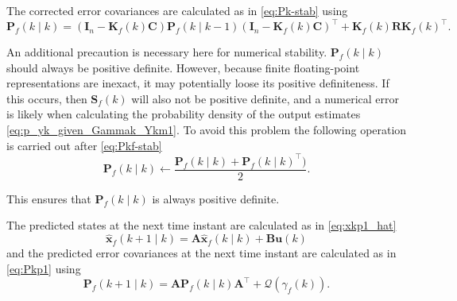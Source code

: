 {{The corrected error covariances are calculated as in \eqref{eq:Pk-stab} using 
%
%
\begin{equation} \label{eq:Pkf-stab}
	\mathbf{P}_f(k \mid k) = \left( \mathbf{I}_n - \mathbf{K}_f(k) \mathbf{C} \right ) \mathbf{P}_f(k \mid k-1) \left( \mathbf{I}_n - \mathbf{K}_f(k) \mathbf{C} \right )^\intercal + \mathbf{K}_f(k) \mathbf{R} \mathbf{K}_f(k)^\intercal.
\end{equation}

An additional precaution is necessary here for numerical stability. $\mathbf{P}_f(k \mid k)$ should always be positive definite. However, because finite floating-point representations are inexact, it may potentially loose its positive definiteness. If this occurs, then $\mathbf{S}_f(k)$ will also not be positive definite, and a numerical error is likely when calculating the probability density of the output estimates \eqref{eq:p_yk_given_Gammak_Ykm1}. To avoid this problem the following operation is carried out after \eqref{eq:Pkf-stab}
\begin{equation} \label{eq:Pkf-psd-fix}
	\mathbf{P}_f(k \mid k) \gets \frac{ \mathbf{P}_f(k \mid k) + \mathbf{P}_f(k \mid k)^\intercal )}{2}. 
\end{equation}

This ensures that $\mathbf{P}_f(k \mid k)$ is always positive definite.

The predicted states at the next time instant are calculated as in \eqref{eq:xkp1_hat}
\begin{equation} \label{eq:xfkp1_hat}
	\mathbf{\hat{x}}_f(k+1 \mid k) = \mathbf{A} \mathbf{\hat{x}}_f(k \mid k) + \mathbf{B} \mathbf{u}(k)
\end{equation}
and the predicted error covariances at the next time instant are calculated as in \eqref{eq:Pkp1} using
%
\begin{equation} \label{eq:Pfkp1}
	\mathbf{P}_f(k+1 \mid k) = \mathbf{A} \mathbf{P}_f(k \mid k)  \mathbf{A}^\intercal  + \mathcal{Q}(\gamma_f(k)).
\end{equation}

}}
